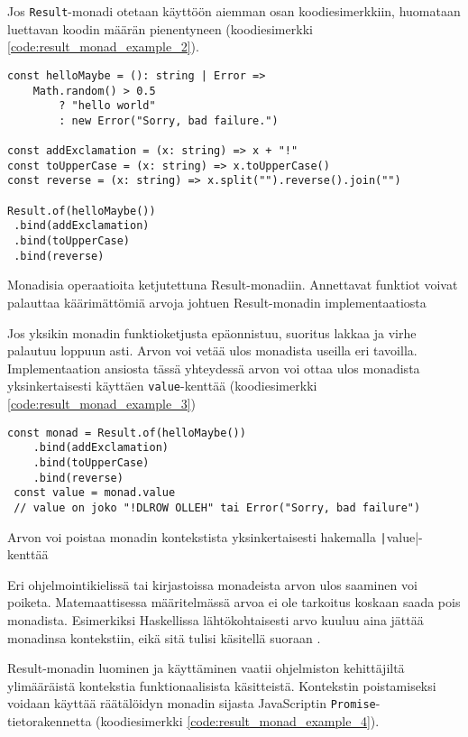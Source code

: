 Jos \texttt{Result}-monadi otetaan käyttöön aiemman osan koodiesimerkkiin, huomataan luettavan koodin määrän pienentyneen (koodiesimerkki \ref{code:result_monad_example_2}).

\begin{code}
    \begin{verbatim}
const helloMaybe = (): string | Error => 
    Math.random() > 0.5 
        ? "hello world" 
        : new Error("Sorry, bad failure.")

const addExclamation = (x: string) => x + "!"
const toUpperCase = (x: string) => x.toUpperCase()
const reverse = (x: string) => x.split("").reverse().join("")

Result.of(helloMaybe())
 .bind(addExclamation)
 .bind(toUpperCase)
 .bind(reverse)
\end{verbatim}
    \caption{Monadisia operaatioita ketjutettuna Result-monadiin. Annettavat funktiot voivat palauttaa käärimättömiä arvoja johtuen Result-monadin implementaatiosta}
    \label{code:result_monad_example_2}
\end{code}

Jos yksikin monadin funktioketjusta epäonnistuu, suoritus lakkaa ja virhe palautuu loppuun asti. Arvon voi vetää ulos monadista useilla eri tavoilla. Implementaation ansiosta tässä yhteydessä arvon voi ottaa ulos monadista yksinkertaisesti käyttäen \texttt{value}-kenttää (koodiesimerkki \ref{code:result_monad_example_3})


\begin{code}
    \begin{verbatim}
const monad = Result.of(helloMaybe())
    .bind(addExclamation)
    .bind(toUpperCase)
    .bind(reverse)
 const value = monad.value
 // value on joko "!DLROW OLLEH" tai Error("Sorry, bad failure")
\end{verbatim}
    \caption{Arvon voi poistaa monadin kontekstista yksinkertaisesti hakemalla \texttt|value|-kenttää }
    \label{code:result_monad_example_3}
\end{code}

Eri ohjelmointikielissä tai kirjastoissa monadeista arvon ulos saaminen voi poiketa. Matemaattisessa määritelmässä arvoa ei ole tarkoitus koskaan saada pois monadista. Esimerkiksi Haskellissa lähtökohtaisesti arvo kuuluu aina jättää monadinsa kontekstiin, eikä sitä tulisi käsitellä suoraan \cite{haskellallmonad}.

Result-monadin luominen ja käyttäminen vaatii ohjelmiston kehittäjiltä ylimääräistä kontekstia funktionaalisista käsitteistä. Kontekstin poistamiseksi voidaan käyttää räätälöidyn monadin sijasta JavaScriptin \texttt{Promise}-tietorakennetta (koodiesimerkki \ref{code:result_monad_example_4}).

